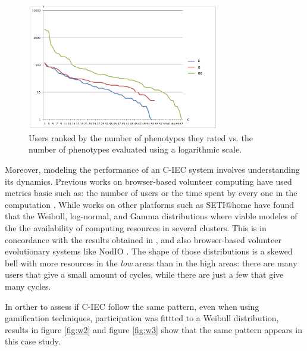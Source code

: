 \begin{figure}[!t]
    \centering
        \includegraphics[width=3.3in]{img/comparison.png}
    \caption{Users ranked by the number of phenotypes they rated vs. the number of phenotypes evaluated using a logarithmic scale. }
    \label{fig:top-ranked-participation}
\end{figure}

Moreover, modeling the performance of an C-IEC system
involves understanding its dynamics. Previous works on browser-based
volunteer computing have used metrics basic such as: 
the number of users or the time spent by every one in the
computation \cite{DBLP:journals/gpem/LaredoBGVAGF14, 2016arXiv160101607M}. 
While works on other platforms such as SETI@home
\cite{javadi2009mining} have found that the Weibull, log-normal, and
Gamma distributions where viable modeles of the  
the availability of computing resources in several clusters.
This is in concordance with the results obtained in \cite{agajaj}, and also
browser-based volunteer evolutionary systems like NodIO \cite{DBLP:conf/gecco/MereloCGCRV16}.
The shape of those distributions is a skewed bell
with more resources in the {\em low} areas than in the high areas:
there are many users that give a small amount of cycles, while there
are just a few that give many cycles. 

In orther to assess if C-IEC follow the same pattern, even when
using gamification techniques, participation was fittted to a 
Weibull distribution, results in figure \ref{fig:w2} and figure \ref{fig:w3}
show that the same pattern appears in this case study. 


